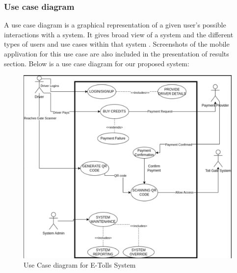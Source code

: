 \clearpage

\subsubsection{Use case diagram}
A use case diagram is a graphical representation of a given user's possible interactions with a system. It gives broad view of a system and the different types of users and use cases within that system \cite{alhir2003learning}. Screenshots of the mobile applivation for this use case are also included in the presentation of results section.
Below is a use case diagram for our proposed system:
\begin{figure}[h]
    \begin{center}
        \hspace{-0.6cm}
        \includegraphics[scale = 0.45]{images/use case diagram}
        \caption{Use Case diagram for E-Tolls System}
    \end{center}
\end{figure}

\clearpage

